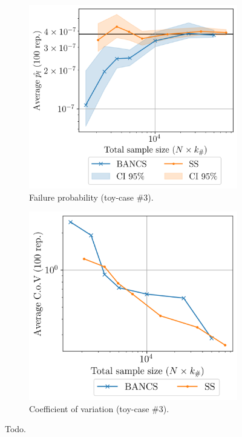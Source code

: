 \begin{figure}
    \begin{subfigure}[b]{0.49\linewidth}
        \centering
        \includegraphics[width=\linewidth]{part3/figures/BANCS/Oscillator_mean.png}
        \caption{Failure probability (toy-case \#3).}
    \end{subfigure}
    \begin{subfigure}[b]{0.47\linewidth}
        \centering
        \includegraphics[width=\linewidth]{part3/figures/BANCS/Oscillator_cov.png}
        \caption{Coefficient of variation (toy-case \#3).}
    \end{subfigure}


    \caption{Todo.}
    \label{fig:bancs_results}
\end{figure}


